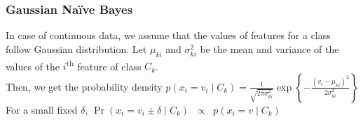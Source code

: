 \subsubsection{Gaussian Na\"ive Bayes}
In case of continuous data, we assume that the values of features for a class follow Gaussian distribution. Let $\mu_{ki}$ and $\sigma^2_{ki}$ be the mean and variance of the values of the $i$\textsuperscript{th} feature of class $C_k$.\\
Then, we get the probability density \enspace
$\boxed{
	p(x_{i} = v_i \mid C_{k}) = 
		\frac1{\sqrt{2\pi\sigma^2_{ki}}}
		\exp\left\{
			-\frac{(v_i - \mu_{ki})^2}{2\sigma^2_{ki}}
		\right\}
}$\\[2mm]
For a small fixed $\delta$, \enspace 
	$\Pr(x_{i} = v_i \pm \delta \mid C_{k}) \;\; \propto\;\;  p(x_{i} = v \mid C_{k})$